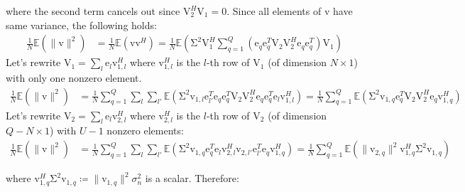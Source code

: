 \documentclass[12pt, draftclsnofoot, onecolumn]{IEEEtran}
\newcommand{\vect}[1]{\boldsymbol{\mathrm{#1}}}
\newcommand{\mat}[1]{\boldsymbol{\mathrm{#1}}}
\begin{document}
where the second term cancels out since $\mat{V}_2^H \mat{V}_1=\mat{0}$. Since all elements of $\vect{v}$ have same variance, the following holds:
\begin{equation}
	\begin{split}
	\frac{1}{N}\mathbb{E}\left(\|\vect{v}\|^2\right)&=\frac{1}{N}\mathbb{E}\left(\vect{v}\vect{v}^H\right) =\frac{1}{N}\mathbb{E} \left( \mat{\Sigma}^2\mat{V}_1^H  \sum_{q=1}^Q\left(\vect{e}_q \vect{e}_q^T \mat{V}_2 \mat{V}_2^H \vect{e}_{q} \vect{e}_{q}^T\right)\mat{V}_1 \right)
	\end{split}
\end{equation}
Let's rewrite $\mat{V}_1=\sum_{l}\vect{e}_{l}\vect{v}_{1,l}^H$ where $\vect{v}_{1,l}^H$ is the $l$-th row of $\mat{V}_1$ (of dimension $N\times 1$) with only one nonzero element.
\begin{equation}
	\begin{split}
	\frac{1}{N}\mathbb{E}\left(\|\vect{v}\|^2\right)&=\frac{1}{N}\sum_{q=1}^Q\sum_{l}\sum_{l'}\mathbb{E} \left( \mat{\Sigma}^2\vect{v}_{1,l}\vect{e}_{l'}^T  \vect{e}_q \vect{e}_q^T \mat{V}_2 \mat{V}_2^H \vect{e}_{q} \vect{e}_{q}^T\vect{e}_{l}\vect{v}_{1,l}^H \right)
	=\frac{1}{N}\sum_{q=1}^Q \mathbb{E} \left( \mat{\Sigma}^2\vect{v}_{1,q}\vect{e}_q^T \mat{V}_2 \mat{V}_2^H \vect{e}_{q} \vect{v}_{1,q}^H \right)
	\end{split}
\end{equation}
Let's rewrite $\mat{V}_2=\sum_{l}\vect{e}_{l}\vect{v}_{2,l}^H$ where $\vect{v}_{2,l}^H$ is the $l$-th row of $\mat{V}_2$ (of dimension $Q-N\times 1$) with $U-1$ nonzero elements:
\begin{equation}
	\begin{split}
	\frac{1}{N}\mathbb{E}\left(\|\vect{v}\|^2\right)&=\frac{1}{N}\sum_{q=1}^Q\sum_l\sum_{l'} \mathbb{E} \left( \mat{\Sigma}^2\vect{v}_{1,q}\vect{e}_q^T \vect{e}_{l}\vect{v}_{2,l}^H \vect{v}_{2,l'} \vect{e}_{l'}^T \vect{e}_{q} \vect{v}_{1,q}^H \right)
	=\frac{1}{N}\sum_{q=1}^Q \mathbb{E} \left( \| \vect{v}_{2,q}\|^2\vect{v}_{1,q}^H\mat{\Sigma}^2\vect{v}_{1,q}  \right)
	\end{split}
\end{equation}

where $\vect{v}_{1,q}^H \mat{\Sigma}^2 \vect{v}_{1,q} \coloneqq  \| \vect{v}_{1,q}\|^2 \sigma_n^2$ is a scalar. Therefore:
\end{document}
